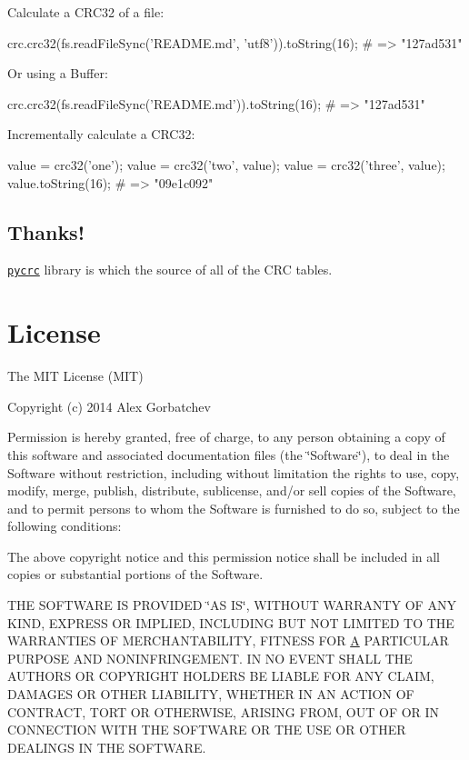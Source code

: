 Calculate a C\+R\+C32 of a file\+: \begin{DoxyVerb}crc.crc32(fs.readFileSync('README.md', 'utf8')).toString(16);
# => "127ad531"
\end{DoxyVerb}


Or using a {\ttfamily Buffer}\+: \begin{DoxyVerb}crc.crc32(fs.readFileSync('README.md')).toString(16);
# => "127ad531"
\end{DoxyVerb}


Incrementally calculate a C\+R\+C32\+: \begin{DoxyVerb}value = crc32('one');
value = crc32('two', value);
value = crc32('three', value);
value.toString(16);
# => "09e1c092"
\end{DoxyVerb}


\subsection*{Thanks!}

\href{http://www.tty1.net/pycrc/}{\tt pycrc} library is which the source of all of the C\+R\+C tables.

\section*{License}

The M\+I\+T License (M\+I\+T)

Copyright (c) 2014 Alex Gorbatchev

Permission is hereby granted, free of charge, to any person obtaining a copy of this software and associated documentation files (the \char`\"{}\+Software\char`\"{}), to deal in the Software without restriction, including without limitation the rights to use, copy, modify, merge, publish, distribute, sublicense, and/or sell copies of the Software, and to permit persons to whom the Software is furnished to do so, subject to the following conditions\+:

The above copyright notice and this permission notice shall be included in all copies or substantial portions of the Software.

T\+H\+E S\+O\+F\+T\+W\+A\+R\+E I\+S P\+R\+O\+V\+I\+D\+E\+D \char`\"{}\+A\+S I\+S\char`\"{}, W\+I\+T\+H\+O\+U\+T W\+A\+R\+R\+A\+N\+T\+Y O\+F A\+N\+Y K\+I\+N\+D, E\+X\+P\+R\+E\+S\+S O\+R I\+M\+P\+L\+I\+E\+D, I\+N\+C\+L\+U\+D\+I\+N\+G B\+U\+T N\+O\+T L\+I\+M\+I\+T\+E\+D T\+O T\+H\+E W\+A\+R\+R\+A\+N\+T\+I\+E\+S O\+F M\+E\+R\+C\+H\+A\+N\+T\+A\+B\+I\+L\+I\+T\+Y, F\+I\+T\+N\+E\+S\+S F\+O\+R \hyperlink{class_a}{A} P\+A\+R\+T\+I\+C\+U\+L\+A\+R P\+U\+R\+P\+O\+S\+E A\+N\+D N\+O\+N\+I\+N\+F\+R\+I\+N\+G\+E\+M\+E\+N\+T. I\+N N\+O E\+V\+E\+N\+T S\+H\+A\+L\+L T\+H\+E A\+U\+T\+H\+O\+R\+S O\+R C\+O\+P\+Y\+R\+I\+G\+H\+T H\+O\+L\+D\+E\+R\+S B\+E L\+I\+A\+B\+L\+E F\+O\+R A\+N\+Y C\+L\+A\+I\+M, D\+A\+M\+A\+G\+E\+S O\+R O\+T\+H\+E\+R L\+I\+A\+B\+I\+L\+I\+T\+Y, W\+H\+E\+T\+H\+E\+R I\+N A\+N A\+C\+T\+I\+O\+N O\+F C\+O\+N\+T\+R\+A\+C\+T, T\+O\+R\+T O\+R O\+T\+H\+E\+R\+W\+I\+S\+E, A\+R\+I\+S\+I\+N\+G F\+R\+O\+M, O\+U\+T O\+F O\+R I\+N C\+O\+N\+N\+E\+C\+T\+I\+O\+N W\+I\+T\+H T\+H\+E S\+O\+F\+T\+W\+A\+R\+E O\+R T\+H\+E U\+S\+E O\+R O\+T\+H\+E\+R D\+E\+A\+L\+I\+N\+G\+S I\+N T\+H\+E S\+O\+F\+T\+W\+A\+R\+E. 